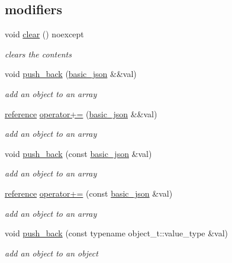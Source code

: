 \subsection*{modifiers}
\begin{DoxyCompactItemize}
\item 
void \hyperlink{a00025_ad6e51670e9c0052856f3fee01df5c44f}{clear} () noexcept
\begin{DoxyCompactList}\small\item\em clears the contents \end{DoxyCompactList}\item 
void \hyperlink{a00025_a486b96adbf4886c38e38c952394a220f}{push\+\_\+back} (\hyperlink{a00025}{basic\+\_\+json} \&\&val)
\begin{DoxyCompactList}\small\item\em add an object to an array \end{DoxyCompactList}\item 
\hyperlink{a00025_a3ec8e17be8732fe436e9d6733f52b7a3}{reference} \hyperlink{a00025_a1c1aa2d148a3e4ce0d4e50cf5b894f41}{operator+=} (\hyperlink{a00025}{basic\+\_\+json} \&\&val)
\begin{DoxyCompactList}\small\item\em add an object to an array \end{DoxyCompactList}\item 
void \hyperlink{a00025_a6f3dfd3e83a1e907d7946b47fcd7ceba}{push\+\_\+back} (const \hyperlink{a00025}{basic\+\_\+json} \&val)
\begin{DoxyCompactList}\small\item\em add an object to an array \end{DoxyCompactList}\item 
\hyperlink{a00025_a3ec8e17be8732fe436e9d6733f52b7a3}{reference} \hyperlink{a00025_a80c21170db6b5ffd9274b3f351cebadc}{operator+=} (const \hyperlink{a00025}{basic\+\_\+json} \&val)
\begin{DoxyCompactList}\small\item\em add an object to an array \end{DoxyCompactList}\item 
void \hyperlink{a00025_a5212588544f6d2266384c3be9bfda0c5}{push\+\_\+back} (const typename object\+\_\+t\+::value\+\_\+type \&val)
\begin{DoxyCompactList}\small\item\em add an object to an object \end{DoxyCompactList}\item 

\end{DoxyCompactItemize}
